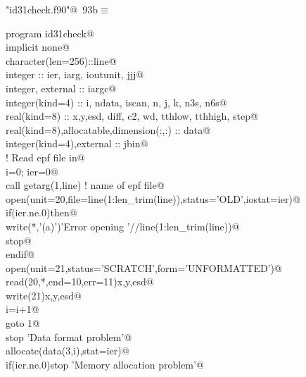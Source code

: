\documentclass[10pt,a4paper,notitlepage]{article}
\begin{document}
\begin{flushleft} \small\label{scrap118}\raggedright\small
{} \verb@"id31check.f90"@\nobreak\ {\footnotesize {93b}}$\equiv$
\vspace{-1ex}
\begin{list}{}{} \item
\mbox{}\verb@      program id31check@\\
\mbox{}\verb@      implicit none@\\
\mbox{}\verb@      character(len=256)::line@\\
\mbox{}\verb@      integer :: ier, iarg, ioutunit, jjj@\\
\mbox{}\verb@      integer, external :: iargc@\\
\mbox{}\verb@      integer(kind=4) :: i, ndata, iscan, n, j, k, n3s, n6s@\\
\mbox{}\verb@      real(kind=8) :: x,y,esd, diff, c2, wd, tthlow, tthhigh, step@\\
\mbox{}\verb@      real(kind=8),allocatable,dimension(:,:) :: data@\\
\mbox{}\verb@      integer(kind=4),external :: jbin@\\
\mbox{}\verb@! Read epf file in@\\
\mbox{}\verb@      i=0; ier=0@\\
\mbox{}\verb@      call getarg(1,line) ! name of epf file@\\
\mbox{}\verb@      open(unit=20,file=line(1:len_trim(line)),status='OLD',iostat=ier)@\\
\mbox{}\verb@      if(ier.ne.0)then@\\
\mbox{}\verb@       write(*,'(a)')'Error opening '//line(1:len_trim(line))@\\
\mbox{}\verb@       stop@\\
\mbox{}\verb@      endif@\\
\mbox{}\verb@      open(unit=21,status='SCRATCH',form='UNFORMATTED')@\\
\mbox{}    read(20,*,end=10,err=11)x,y,esd@\\
\mbox{}\verb@      write(21)x,y,esd@\\
\mbox{}\verb@      i=i+1@\\
\mbox{}\verb@      goto 1@\\
\mbox{}   stop 'Data format problem'@\\
\mbox{}   allocate(data(3,i),stat=ier)@\\
\mbox{}\verb@      if(ier.ne.0)stop 'Memory allocation problem'@\\

\end{list}
\end{flushleft}
\end{document}
